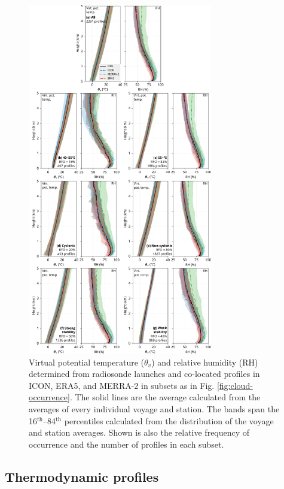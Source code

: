 \documentclass[draft]{agujournal2019}
\begin{document}
\begin{figure}[p!]
\centering
\includegraphics[width=0.72\textwidth]{img/theta_hur.pdf}
\caption{
Virtual potential temperature ($\theta_v$) and relative humidity (RH)
determined from radiosonde launches and co-located profiles in ICON, ERA5, and
MERRA-2 in subsets as in Fig. \ref{fig:cloud-occurrence}.  The solid lines are
the average calculated from the averages of every individual voyage and
station. The bands span the 16$^\mathrm{th}$--84$^\mathrm{th}$ percentiles
calculated from the distribution of the voyage and station averages. Shown is
also the relative frequency of occurrence and the number of profiles in each
subset.
}
\label{fig:potential-temperature}
\end{figure}

\subsection{Thermodynamic profiles}
\end{document}
